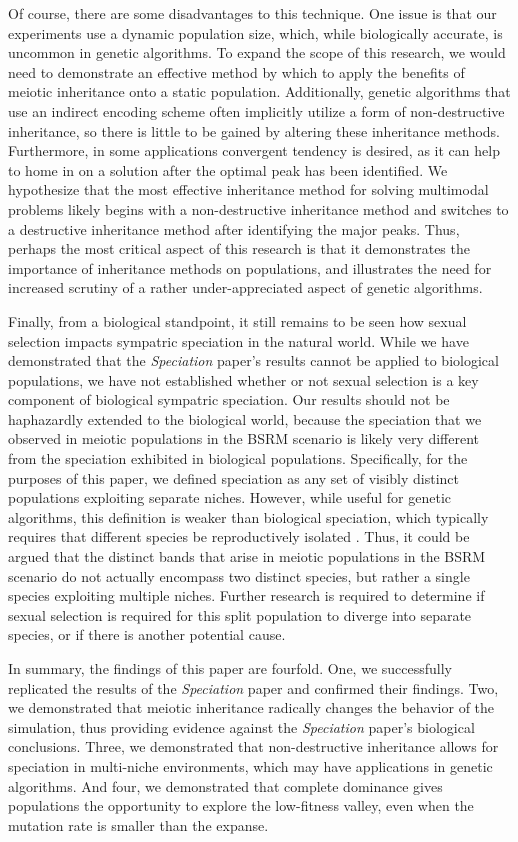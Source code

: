 \documentclass{article}
\begin{document}
Of course, there are some disadvantages to this technique. One issue is that our experiments use a dynamic population size, which, while biologically accurate, is uncommon in genetic algorithms. To expand the scope of this research, we would need to demonstrate an effective method by which to apply the benefits of meiotic inheritance onto a static population. Additionally, genetic algorithms that use an indirect encoding scheme often implicitly utilize a form of non-destructive inheritance, so there is little to be gained by altering these inheritance methods. Furthermore, in some applications convergent tendency is desired, as it can help to home in on a solution after the optimal peak has been identified. We hypothesize that the most effective inheritance method for solving multimodal problems likely begins with a non-destructive inheritance method and switches to a destructive inheritance method after identifying the major peaks. Thus, perhaps the most critical aspect of this research is that it demonstrates the importance of inheritance methods on populations, and illustrates the need for increased scrutiny of a rather under-appreciated aspect of genetic algorithms.

Finally, from a biological standpoint, it still remains to be seen how sexual selection impacts sympatric speciation in the natural world. While we have demonstrated that the \textit{Speciation} paper’s results cannot be applied to biological populations, we have not established whether or not sexual selection is a key component of biological sympatric speciation. Our results should not be haphazardly extended to the biological world, because the speciation that we observed in meiotic populations in the BSRM scenario is likely very different from the speciation exhibited in biological populations. Specifically, for the purposes of this paper, we defined speciation as any set of visibly distinct populations exploiting separate niches. However, while useful for genetic algorithms, this definition is weaker than biological speciation, which typically requires that different species be reproductively isolated \cite{TEXTBOOK}. Thus, it could be argued that the distinct bands that arise in meiotic populations in the BSRM scenario do not actually encompass two distinct species, but rather a single species exploiting multiple niches. Further research is required to determine if sexual selection is required for this split population to diverge into separate species, or if there is another potential cause.

In summary, the findings of this paper are fourfold. One, we successfully replicated the results of the \textit{Speciation} paper and confirmed their findings. Two, we demonstrated that meiotic inheritance radically changes the behavior of the simulation, thus providing evidence against the \textit{Speciation} paper's biological conclusions. Three, we demonstrated that non-destructive inheritance allows for speciation in multi-niche environments, which may have applications in genetic algorithms. And four, we demonstrated that complete dominance gives populations the opportunity to explore the low-fitness valley, even when the mutation rate is smaller than the expanse. 
\end{document}
